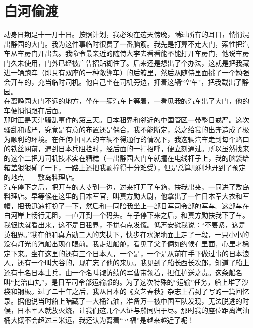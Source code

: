 \fancyhead[RO]{} %
\fancyhead[LE]{} %
\chapter*{白河偷渡}
\thispagestyle{empty}
动身日期是十一月十日。按照计划，我必须在这天傍晚，瞒过所有的耳目，悄悄混出静园的大门。我为这件事临时很费了一番脑筋。我先是打算不走大门，索性把汽车从车房门开出去。我命令最亲近的随侍大李去看看能不能打开车房门，他说车房门久未使用，门外已经被广告招贴糊住了。后来还是想出了个办法，这就是把我藏进一辆跑车（即只有双座的一种敞篷车）的后箱里，然后从随侍里面挑了一个勉强会开车的，充当临时司机。他自己坐在司机旁边，押着这辆“空车”，把我载出了静园。\\

在离静园大门不远的地方，坐在一辆汽车上等着，一看见我的汽车出了大门，他的车便悄悄跟在后面。\\

那时正是天津骚乱事件的第三天。日本租界和邻近的中国管区一带整日戒严。这次骚乱和戒严，究竟是有意的布置还是偶合，我不能断定，总之给我的出奔造成了极为顺利的环境。在任何中国人的车辆不得通行的情况下，我这辆汽车走到每个路口的铁丝网前，遇到日本兵阻拦时，经后面的一打招呼，便立刻通过。所以虽然找来的这个二把刀司机技术实在糟糕（一出静园大门车就撞在电线杆子上，我的脑袋给箱盖狠狠碰了一下，一路上还把我颠撞得十分难受），但是总算顺利地开到了预定的地点——敷岛料理店。\\

汽车停下之后，把开车的人支到一边，过来打开了车箱，扶我出来，一同进了敷岛料理店。早等候在这里的日本军官，叫真方勋大尉，他拿出了一件日本军大衣和军帽，把我迅速打扮了一下，然后和一同陪我坐上一部日军司令部的军车。这部车在白河岸上畅行无阻，一直开到一个码头。车子停下来之后，和真方勋扶我下了车。我很快就看出来，这不是日租界，不觉有点发慌。低声安慰我说：“不要紧，这是英租界。”我在他和真方勋二人的夹扶下，快步在水泥地面上走了一段，一只小小的没有灯光的汽船出现在眼前。我走进船舱，看见了父子俩如约候在里面，心里才稳定下来。坐在这里的还有三个日本人，一个是，一个是从前在手下做过事的日本浪人，还有一个叫大谷的，现在忘了他的来历。我见到了船长西长次郎，知道了船上还有十名日本士兵，由一个名叫诹访绩的军曹带领着，担任护送之责。这条船名叫“比治山丸”，是日军司令部运输部的。为了这次特殊的“运输”任务，船上堆了沙袋和钢板。过了二十年之后，我从日本的《文艺春秋》杂志上看到了写的一篇回忆录。据他说当时船上暗藏了一大桶汽油，准备万一被中国军队发现，无法脱逃的时候，日本军人就放火烧，让我们这几个人证与船同归于尽。那时我的座位距离汽油桶大概不会超过三米远，我还认为离着“幸福”是越来越近了呢！\\

